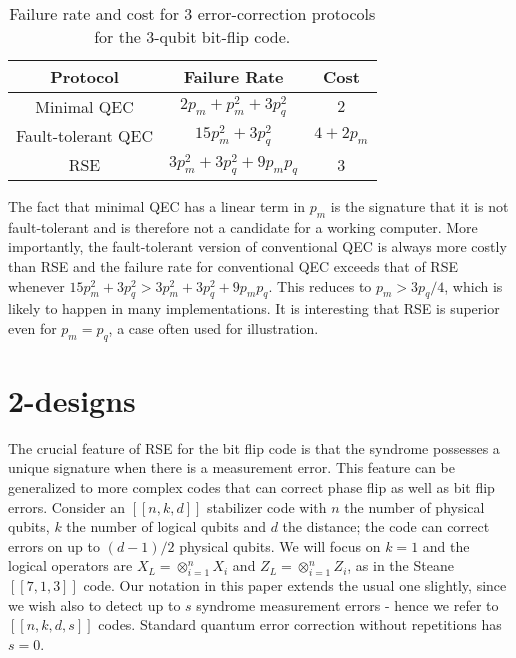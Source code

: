 \documentclass[reprint, superscriptaddress]{revtex4-1}
\numberwithin{equation}{section}
\numberwithin{figure}{section}
\numberwithin{table}{section}
\begin{document}
\begin{table} 
	\begin{tabular}{c|c|c}

	Protocol & Failure Rate & Cost \\
	\hline\hline
	Minimal QEC & $2p_m + p_m^2 + 3p_q^2$  &  $2$ \\
	Fault-tolerant QEC  & $15 p_m^2 + 3 p_q^2$  &  $4 + 2 p_m$  \\
	RSE  &  $3p_m^2 + 3 p_q^2 + 9 p_m p_q$  &  3\\
	\end{tabular}
	\caption {Failure rate and cost for 3 error-correction protocols 
	for the 3-qubit bit-flip code.}
	\label{Table1}
\end{table}

The fact that minimal QEC has a linear term in $p_m$ is the signature that it is not fault-tolerant and is therefore not a candidate for a working computer.  More importantly, the fault-tolerant version of conventional QEC is always more costly than RSE and the failure rate for conventional QEC exceeds that of RSE whenever $15p_m^2 + 3 p_q^2 > 3 p_m^2 + 3 p_q^2 + 9 p_m p_q$.  This reduces to $p_m > 3 p_q /4$, which is likely to happen in many implementations.  It is interesting that RSE is superior even for $p_m = p_q$, a case often used for illustration.  

\section{2-designs}

The crucial feature of RSE for the bit flip code is that the syndrome possesses a unique signature when there is a measurement error.  This feature can be generalized to more complex codes that can correct phase flip as well as bit flip errors.  Consider an $[[n,k,d]]$ stabilizer code with $n$ the number of physical qubits, $k$ the number of logical qubits and $d$ the distance; the code can correct errors on up to $(d-1)/2$ physical qubits.  We will focus on $k=1$ and the logical operators are $X_L=\otimes_{i=1}^{n} X_i$ and $Z_L=\otimes_{i=1}^{n} Z_i$, as in the Steane $[[7,1,3]]$ code.  Our notation in this paper extends the usual one slightly, since we wish also to detect up to $s$ syndrome measurement errors - hence we refer to $[[n,k,d,s]]$ codes.  Standard quantum error correction without repetitions has $s=0$.  
\end{document}
